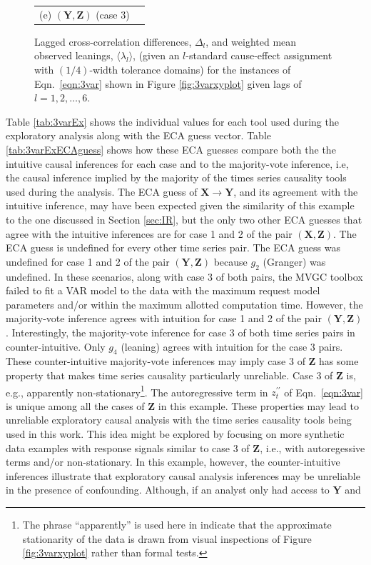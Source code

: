 {\begin{center}
\begin{figure}[h]
\begin{center}
\begin{tabular}{cc}
(e) $(\mathbf{Y},\mathbf{Z})$ (case 3) & 
\end{tabular}
\end{center}
\caption[Lagged cross-correlation differences and weighted mean observed leanings]{Lagged cross-correlation differences, $\Delta_l$, and weighted mean observed leanings, $\langle\lambda_l\rangle$, (given an $l$-standard cause-effect assignment with $(1/4)$-width tolerance domains) for the instances of Eqn.\ \ref{eqn:3var} shown in Figure \ref{fig:3varxyplot} given lags of $l=1,2,\ldots,6$.}
\label{fig:3varxyLandLCC}
\end{figure}
\end{center}
\vspace*{\fill}
\clearpage
}
Table \ref{tab:3varEx} shows the individual values for each tool used during the exploratory analysis along with the ECA guess vector.  Table \ref{tab:3varExECAguess} shows how these ECA guesses compare both the the intuitive causal inferences for each case and to the majority-vote inference, i.e, the causal inference implied by the majority of the times series causality tools used during the analysis.  The ECA guess of $\mathbf{X}\rightarrow\mathbf{Y}$, and its agreement with the intuitive inference, may have been expected given the similarity of this example to the one discussed in Section \ref{sec:IR}, but the only two other ECA guesses that agree with the intuitive inferences are for case 1 and 2 of the pair $(\mathbf{X},\mathbf{Z})$.  The ECA guess is undefined for every other time series pair.  The ECA guess was undefined for case 1 and 2 of the pair $(\mathbf{Y},\mathbf{Z})$ because $g_2$ (Granger) was undefined.  In these scenarios, along with case 3 of both pairs, the MVGC toolbox failed to fit a VAR model to the data with the maximum request model parameters and/or within the maximum allotted computation time.  However, the majority-vote inference agrees with intuition for case 1 and 2 of the pair $(\mathbf{Y},\mathbf{Z})$.  Interestingly, the majority-vote inference for case 3 of both time series pairs in counter-intuitive.  Only $g_4$ (leaning) agrees with intuition for the case 3 pairs.  These counter-intuitive majority-vote inferences may imply case 3 of $\mathbf{Z}$ has some property that makes time series causality particularly unreliable.  Case 3 of $\mathbf{Z}$ is, e.g., apparently non-stationary\footnote{The phrase ``apparently'' is used here in indicate that the approximate stationarity of the data is drawn from visual inspections of Figure \ref{fig:3varxyplot} rather than formal tests.}.  The autoregressive term in $z_t^{\prime\prime}$ of Eqn.\ \ref{eqn:3var} is unique among all the cases of $\mathbf{Z}$ in this example.  These properties may lead to unreliable exploratory causal analysis with the time series causality tools being used in this work.  This idea might be explored by focusing on more synthetic data examples with response signals similar to case 3 of $\mathbf{Z}$, i.e., with autoregessive terms and/or non-stationary.  In this example, however, the counter-intuitive inferences illustrate that exploratory causal analysis inferences may be unreliable in the presence of confounding.  Although, if an analyst only had access to $\mathbf{Y}$ and 